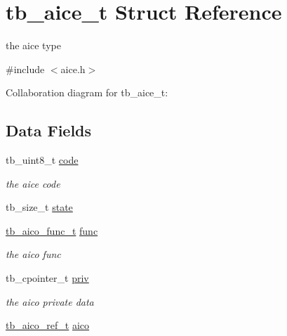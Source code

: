 \hypertarget{structtb__aice__t}{\section{tb\-\_\-aice\-\_\-t Struct Reference}
\label{structtb__aice__t}
}


the aice type  




{\ttfamily \#include $<$aice.\-h$>$}



Collaboration diagram for tb\-\_\-aice\-\_\-t\-:
\subsection*{Data Fields}
\begin{DoxyCompactItemize}
\item 
\hypertarget{structtb__aice__t_a0b5d3e05ab501ccfcc5fc53aa0b9c2bf}{tb\-\_\-uint8\-\_\-t \hyperlink{structtb__aice__t_a0b5d3e05ab501ccfcc5fc53aa0b9c2bf}{code}}\label{structtb__aice__t_a0b5d3e05ab501ccfcc5fc53aa0b9c2bf}

\begin{DoxyCompactList}\small\item\em the aice code \end{DoxyCompactList}\item 
tb\-\_\-size\-\_\-t \hyperlink{structtb__aice__t_ad3218bed02b974c5b36f5314ee57b86f}{state}
\item 
\hypertarget{structtb__aice__t_a6b758fec76e6d5b7a53e7613bc7249eb}{\hyperlink{aico_8h_a04afbc8c983da2a6fd29114514e34abe}{tb\-\_\-aico\-\_\-func\-\_\-t} \hyperlink{structtb__aice__t_a6b758fec76e6d5b7a53e7613bc7249eb}{func}}\label{structtb__aice__t_a6b758fec76e6d5b7a53e7613bc7249eb}

\begin{DoxyCompactList}\small\item\em the aico func \end{DoxyCompactList}\item 
\hypertarget{structtb__aice__t_a8ffc86265fbad298d3c86134872806e1}{tb\-\_\-cpointer\-\_\-t \hyperlink{structtb__aice__t_a8ffc86265fbad298d3c86134872806e1}{priv}}\label{structtb__aice__t_a8ffc86265fbad298d3c86134872806e1}

\begin{DoxyCompactList}\small\item\em the aico private data \end{DoxyCompactList}\item 
\hypertarget{structtb__aice__t_acd81585aa8d2fe688ede3eec5e2c363a}{\hyperlink{structtb__aico__ref__t}{tb\-\_\-aico\-\_\-ref\-\_\-t} \hyperlink{structtb__aice__t_acd81585aa8d2fe688ede3eec5e2c363a}{aico}}\label{structtb__aice__t_acd81585aa8d2fe688ede3eec5e2c363a}


\end{DoxyCompactItemize}
